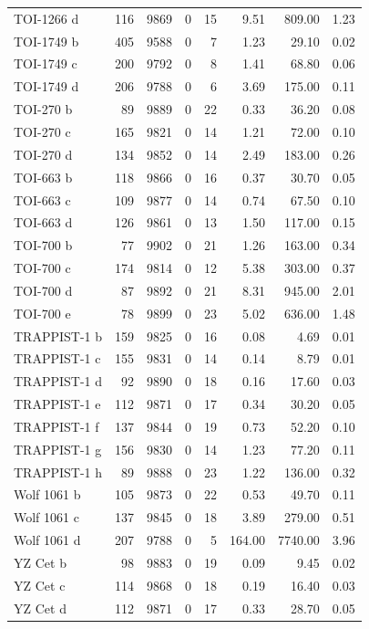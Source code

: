 \begin{table}
\begin{tabular}{lrrrrrrr}
TOI-1266 d & 116 & 9869 & 0 & 15 & 9.51 & 809.00 & 1.23 \\
TOI-1749 b & 405 & 9588 & 0 & 7 & 1.23 & 29.10 & 0.02 \\
TOI-1749 c & 200 & 9792 & 0 & 8 & 1.41 & 68.80 & 0.06 \\
TOI-1749 d & 206 & 9788 & 0 & 6 & 3.69 & 175.00 & 0.11 \\
TOI-270 b & 89 & 9889 & 0 & 22 & 0.33 & 36.20 & 0.08 \\
TOI-270 c & 165 & 9821 & 0 & 14 & 1.21 & 72.00 & 0.10 \\
TOI-270 d & 134 & 9852 & 0 & 14 & 2.49 & 183.00 & 0.26 \\
TOI-663 b & 118 & 9866 & 0 & 16 & 0.37 & 30.70 & 0.05 \\
TOI-663 c & 109 & 9877 & 0 & 14 & 0.74 & 67.50 & 0.10 \\
TOI-663 d & 126 & 9861 & 0 & 13 & 1.50 & 117.00 & 0.15 \\
TOI-700 b & 77 & 9902 & 0 & 21 & 1.26 & 163.00 & 0.34 \\
TOI-700 c & 174 & 9814 & 0 & 12 & 5.38 & 303.00 & 0.37 \\
TOI-700 d & 87 & 9892 & 0 & 21 & 8.31 & 945.00 & 2.01 \\
TOI-700 e & 78 & 9899 & 0 & 23 & 5.02 & 636.00 & 1.48 \\
TRAPPIST-1 b & 159 & 9825 & 0 & 16 & 0.08 & 4.69 & 0.01 \\
TRAPPIST-1 c & 155 & 9831 & 0 & 14 & 0.14 & 8.79 & 0.01 \\
TRAPPIST-1 d & 92 & 9890 & 0 & 18 & 0.16 & 17.60 & 0.03 \\
TRAPPIST-1 e & 112 & 9871 & 0 & 17 & 0.34 & 30.20 & 0.05 \\
TRAPPIST-1 f & 137 & 9844 & 0 & 19 & 0.73 & 52.20 & 0.10 \\
TRAPPIST-1 g & 156 & 9830 & 0 & 14 & 1.23 & 77.20 & 0.11 \\
TRAPPIST-1 h & 89 & 9888 & 0 & 23 & 1.22 & 136.00 & 0.32 \\
Wolf 1061 b & 105 & 9873 & 0 & 22 & 0.53 & 49.70 & 0.11 \\
Wolf 1061 c & 137 & 9845 & 0 & 18 & 3.89 & 279.00 & 0.51 \\
Wolf 1061 d & 207 & 9788 & 0 & 5 & 164.00 & 7740.00 & 3.96 \\
YZ Cet b & 98 & 9883 & 0 & 19 & 0.09 & 9.45 & 0.02 \\
YZ Cet c & 114 & 9868 & 0 & 18 & 0.19 & 16.40 & 0.03 \\
YZ Cet d & 112 & 9871 & 0 & 17 & 0.33 & 28.70 & 0.05 \\
\bottomrule
\end{tabular}
\end{table}
